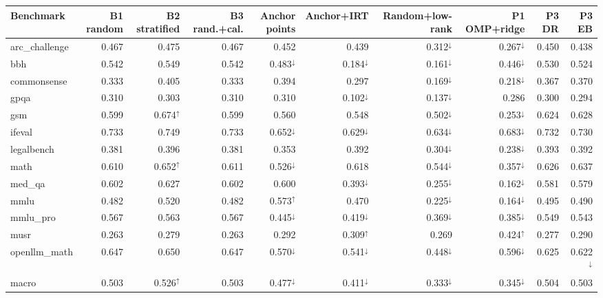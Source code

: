 {\scriptsize\setlength{\tabcolsep}{2.5pt}
\begin{tabular}{lrrrrrrrrr}
\toprule
Benchmark & B1 random & B2 stratified & B3 rand.+cal. & Anchor points & Anchor+IRT & Random+low-rank & P1 OMP+ridge & P3 DR & P3 EB \\
\midrule
arc\_challenge & 0.467 & 0.475 & 0.467 & 0.452 & 0.439 & 0.312$^{\downarrow}$ & 0.267$^{\downarrow}$ & 0.450 & 0.438 \\
bbh & 0.542 & 0.549 & 0.542 & 0.483$^{\downarrow}$ & 0.184$^{\downarrow}$ & 0.161$^{\downarrow}$ & 0.446$^{\downarrow}$ & 0.530 & 0.524 \\
commonsense & 0.333 & 0.405 & 0.333 & 0.394 & 0.297 & 0.169$^{\downarrow}$ & 0.218$^{\downarrow}$ & 0.367 & 0.370 \\
gpqa & 0.310 & 0.303 & 0.310 & 0.310 & 0.102$^{\downarrow}$ & 0.137$^{\downarrow}$ & 0.286 & 0.300 & 0.294 \\
gsm & 0.599 & 0.674$^{\uparrow}$ & 0.599 & 0.560 & 0.548 & 0.502$^{\downarrow}$ & 0.253$^{\downarrow}$ & 0.624 & 0.628 \\
ifeval & 0.733 & 0.749 & 0.733 & 0.652$^{\downarrow}$ & 0.629$^{\downarrow}$ & 0.634$^{\downarrow}$ & 0.683$^{\downarrow}$ & 0.732 & 0.730 \\
legalbench & 0.381 & 0.396 & 0.381 & 0.353 & 0.392 & 0.304$^{\downarrow}$ & 0.238$^{\downarrow}$ & 0.393 & 0.392 \\
math & 0.610 & 0.652$^{\uparrow}$ & 0.611 & 0.526$^{\downarrow}$ & 0.618 & 0.544$^{\downarrow}$ & 0.357$^{\downarrow}$ & 0.626 & 0.637 \\
med\_qa & 0.602 & 0.627 & 0.602 & 0.600 & 0.393$^{\downarrow}$ & 0.255$^{\downarrow}$ & 0.162$^{\downarrow}$ & 0.581 & 0.579 \\
mmlu & 0.482 & 0.520 & 0.482 & 0.573$^{\uparrow}$ & 0.470 & 0.225$^{\downarrow}$ & 0.164$^{\downarrow}$ & 0.495 & 0.490 \\
mmlu\_pro & 0.567 & 0.563 & 0.567 & 0.445$^{\downarrow}$ & 0.419$^{\downarrow}$ & 0.369$^{\downarrow}$ & 0.385$^{\downarrow}$ & 0.549 & 0.543 \\
musr & 0.263 & 0.279 & 0.263 & 0.292 & 0.309$^{\uparrow}$ & 0.269 & 0.424$^{\uparrow}$ & 0.277 & 0.290 \\
openllm\_math & 0.647 & 0.650 & 0.647 & 0.570$^{\downarrow}$ & 0.541$^{\downarrow}$ & 0.448$^{\downarrow}$ & 0.596$^{\downarrow}$ & 0.625 & 0.622$^{\downarrow}$ \\
\midrule
macro & 0.503 & 0.526$^{\uparrow}$ & 0.503 & 0.477$^{\downarrow}$ & 0.411$^{\downarrow}$ & 0.333$^{\downarrow}$ & 0.345$^{\downarrow}$ & 0.504 & 0.503 \\
\bottomrule
\end{tabular}}
